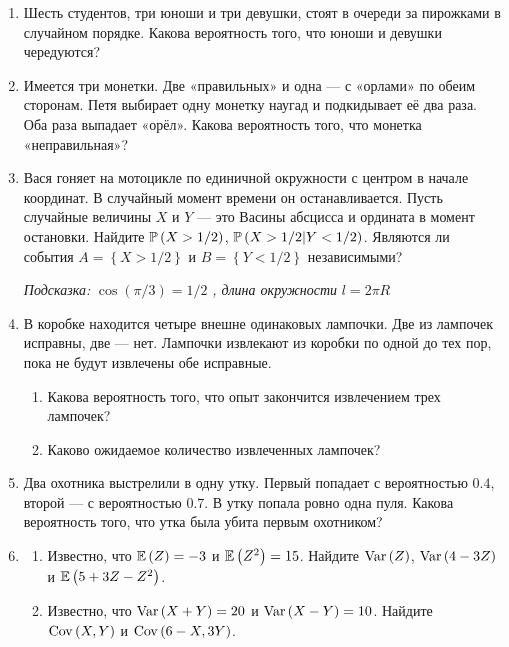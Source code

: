 \begin{enumerate}
\item Шесть студентов, три юноши и три девушки, стоят в очереди за пирожками в
случайном порядке. Какова вероятность того, что юноши и девушки чередуются?

\item Имеется три монетки. Две «правильных» и одна — с «орлами» по обеим сторонам.
Петя выбирает одну монетку наугад и подкидывает её два раза. Оба раза выпадает «орёл».
Какова вероятность того, что монетка «неправильная»?

\item Вася гоняет на мотоцикле по единичной окружности с центром в начале координат.
В случайный момент времени он останавливается. Пусть случайные величины $X$ и $Y$
— это Васины абсцисса и ордината в момент остановки. Найдите  $\P\left(X > 1/2
\right)$,  $\P\left(X > 1/2 |Y < 1/2 \right)$. Являются ли события
$A=\left\{X > 1/2 \right\}$ и $B=\left\{Y < 1/2 \right\}$ независимыми?

{\it Подсказка: } $\cos\left(\pi / 3 \right) = 1/2$ {\it , длина окружности } $l = 2 \pi R$

\item В коробке находится четыре внешне одинаковых лампочки. Две из лампочек исправны,
две — нет. Лампочки извлекают из коробки по одной до тех пор, пока не будут извлечены
обе исправные.
\begin{enumerate}
\item	Какова вероятность того, что опыт закончится извлечением трех лампочек?
\item Каково ожидаемое количество извлеченных лампочек?
\end{enumerate}

\item Два охотника выстрелили в одну утку. Первый попадает с вероятностью $0.4$,
второй — с вероятностью $0.7$. В утку попала ровно одна пуля. Какова вероятность
того, что утка была убита первым охотником?

\item
\begin{enumerate}
\item Известно, что $\E\left(Z\right) = -3$ и $\E\left(Z^{2} \right) = 15$.
Найдите  $\Var\left(Z\right)$, $\Var\left(4 - 3Z \right)$ и $\E\left(5 + 3Z - Z^{2} \right)$.
\item Известно, что $\Var\left(X + Y \right) = 20$ и $\Var\left(X - Y\right) = 10$.
Найдите $\Cov\left(X, Y \right)$ и $\Cov\left(6 - X, 3Y \right)$.
\end{enumerate}


\end{enumerate}
